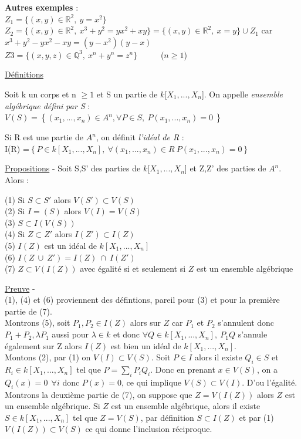 \documentclass[10pt, twoside]{article}
\theoremstyle{plain}
\theoremstyle{definition}
\theoremstyle{plain}
\theoremstyle{plain}
\theoremstyle{definition}
\theoremstyle{remark}
\begin{document}
\textbf{Autres exemples} :\\
 $Z_{1}=\{(x,y) \in \mathbb{R}^{2},\ y = x^{2}  \}$\\
 $Z_{2} = \{(x,y) \in \mathbb{R} ^{2}, \ x^{3} +  y^{2} = yx^{2} + xy \}  = \{(x,y) \in \mathbb{R} ^{2}, \ x = y\} \cup Z_{1}$  car \ $x^{3} + y^{2} - yx^{2} - xy = (y-x^{2})(y-x) $
\\ 
$ Z{3} =\{(x,y,z) \in \mathbb{Q}^{3},\ x^{n} + y^{n} = z^{n}\} $   \ \ \ \ \ ($n\geq 1 $)

\underline{Définitions} 

Soit k un corps et n $\geq 1$ et S un partie de $k$[$X_{1},...,X_{n}$]. On appelle \textit{ensemble algébrique défini par S} : \\ $V(S) = \left\{  (x_{1}, ... , x_{n}) \in A^{n} , \forall P \in S , \ P(x_{1}, ... , x_{n}) = 0 \ \right\}$


Si R est une partie de $A^{n}$, on définit \textit{l'idéal de R} :\\
I(R) =$\left\{  P \in k[X_{1},...,X_{n}], \  \forall(x_{1}, ... , x_{n}) \in R \ P(x_{1}, ... , x_{n}) = 0  \right\}$

\underline{Propositions} - Soit S,S' des parties de $k$[$X_{1},...,X_{n}$] et Z,Z' des parties de $A^{n}$. Alors :

 (1) Si $S \subset  S' $ alors $V(S') \subset V(S) $
\\(2) Si $I = (S)$ alors $V(I) =V(S) $
\\(3) $S \subset I(V(S))$
\\ (4) Si $Z \subset Z'$ alors $I(Z') \subset I(Z)$
\\ (5) $I(Z)$ est un idéal de $k[X_{1},...,X_{n}]$
\\ (6) $I(Z \ \cup \ Z') = I(Z)\ \cap \ I(Z')$
\\ (7) $Z\subset V(I(Z)) $ avec égalité si et seulement si $Z$ est un ensemble algébrique

\underline{Preuve} - \\ (1), (4) et (6) proviennent des défintions, pareil pour (3) et pour la première partie de (7).
\\ Montrons (5), soit $P_{1},P_{2} \in I(Z)$ alors sur $Z$ car $P_{1}$ et $P_{2}$ s'annulent donc $P_{1} + P_{2}, \lambda P_{1}$ aussi pour $\lambda \in k$ et donc $\forall Q \in k[X_{1},...,X_{n}], \ P_{1}Q$ s'annule également sur Z alors $I(Z)$ est bien un idéal de $k[X_{1},...,X_{n}]$.
\\ Montons (2), par (1) on $V(I) \subset V(S)$. Soit $P \in I$ alors il existe $ Q_{i} \in S $ et $R_{i} \in k[X_{1},...,X_{n}]$ tel que $P = \sum_{i} P_{i}Q_{i} $. Donc en prenant $ x \in V(S)$, on a $Q_{i}(x) = 0 \  \ \forall i$ donc $ P(x) = 0$, ce qui implique $V(S) \subset V(I)$. D'ou l'égalité.
\\ Montrons la deuxième partie de (7), on suppose que $Z = V(I(Z))$ alors $Z$ est un ensemble algébrique. Si $Z$ est un ensemble algébrique, alors il existe $S \in k[X_{1},...,X_{n}]$ tel que $Z =V(S)$, par définition $S \subset I(Z)$ et par (1) $V(I(Z)) \subset V(S)$ ce qui donne l'inclusion réciproque.
\end{document}

